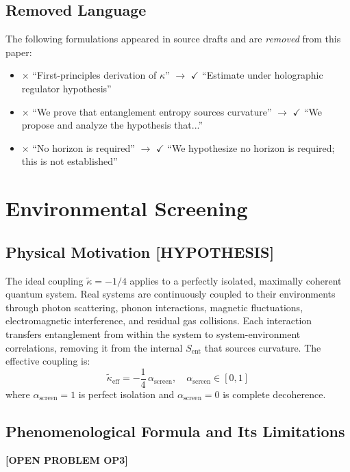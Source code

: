 \documentclass[12pt,letterpaper]{article}
\theoremstyle{plain}
\theoremstyle{definition}
\theoremstyle{remark}
\newcommand{\Sent}{S_{\mathrm{ent}}}
\newcommand{\tkappaeff}{\tilde{\kappa}_{\mathrm{eff}}}
\newcommand{\ascreen}{\alpha_{\mathrm{screen}}}
\begin{document}
\subsection{Removed Language}

The following formulations appeared in source drafts and are
\emph{removed} from this paper:

\begin{itemize}
  \item $\times$ ``First-principles derivation of $\kappa$'' $\to$
    $\checkmark$ ``Estimate under holographic regulator hypothesis''
  \item $\times$ ``We prove that entanglement entropy sources curvature''
    $\to$ $\checkmark$ ``We propose and analyze the hypothesis that...''
  \item $\times$ ``No horizon is required'' $\to$ $\checkmark$
    ``We hypothesize no horizon is required; this is not established''
\end{itemize}

\section{Environmental Screening}
\label{sec:screening}

\subsection{Physical Motivation \textcolor{orange!80!black}{[HYPOTHESIS]}}

The ideal coupling $\tilde{\kappa} = -1/4$ applies to a perfectly
isolated, maximally coherent quantum system. Real systems are
continuously coupled to their environments through photon scattering,
phonon interactions, magnetic fluctuations, electromagnetic interference,
and residual gas collisions. Each interaction transfers entanglement from
within the system to system-environment correlations, removing it from
the internal $\Sent$ that sources curvature. The effective coupling is:
\begin{equation}
  \tkappaeff = -\frac{1}{4}\,\ascreen,\quad \ascreen\in[0,1]
  \tag{A4.1}
\end{equation}
where $\ascreen = 1$ is perfect isolation and $\ascreen = 0$ is
complete decoherence.

\subsection{Phenomenological Formula and Its Limitations}
\textcolor{red!70!black}{\textbf{[OPEN PROBLEM OP3]}}
\end{document}
